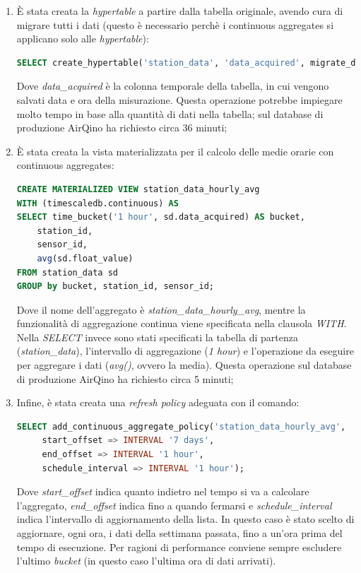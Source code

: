\begin{enumerate}
  \item È stata creata la \textit{hypertable} a partire dalla tabella originale, avendo cura di migrare tutti i dati (questo è necessario perchè i continuous aggregates si applicano solo alle \textit{hypertable}):
\vspace{1mm}
\begin{lstlisting}[language=sql]
SELECT create_hypertable('station_data', 'data_acquired', migrate_data => true);
\end{lstlisting}
Dove \textit{data\_acquired} è la colonna temporale della tabella, in cui vengono salvati data e ora della misurazione.
Questa operazione potrebbe impiegare molto tempo in base alla quantità di dati nella tabella; sul database di produzione AirQino ha richiesto circa 36 minuti;
  \item È stata creata la vista materializzata per il calcolo delle medie orarie con continuous aggregates:
\vspace{1mm}
\begin{lstlisting}[language=sql]
CREATE MATERIALIZED VIEW station_data_hourly_avg
WITH (timescaledb.continuous) AS
SELECT time_bucket('1 hour', sd.data_acquired) AS bucket, 
    station_id,  
    sensor_id, 
    avg(sd.float_value) 
FROM station_data sd
GROUP by bucket, station_id, sensor_id;
\end{lstlisting}
Dove il nome dell'aggregato è \textit{station\_data\_hourly\_avg}, mentre la funzionalità di aggregazione continua viene specificata nella clausola \textit{WITH}. Nella \textit{SELECT} invece sono stati specificati la tabella di partenza (\textit{station\_data}), l'intervallo di aggregazione (\textit{1 hour}) e l'operazione da eseguire per aggregare i dati (\textit{avg()}, ovvero la media).
Questa operazione sul database di produzione AirQino ha richiesto circa 5 minuti;
  \item Infine, è stata creata una \textit{refresh policy} adeguata con il comando:
\vspace{1mm}
\begin{lstlisting}[language=sql]
SELECT add_continuous_aggregate_policy('station_data_hourly_avg',
     start_offset => INTERVAL '7 days',
     end_offset => INTERVAL '1 hour',
     schedule_interval => INTERVAL '1 hour');
\end{lstlisting}
Dove \textit{start\_offset} indica quanto indietro nel tempo si va a calcolare l'aggregato, \textit{end\_offset} indica fino a quando fermarsi e \textit{schedule\_interval} indica l'intervallo di aggiornamento della lista.
In questo caso è stato scelto di aggiornare, ogni ora, i dati della settimana passata, fino a un'ora prima del tempo di esecuzione.
Per ragioni di performance conviene sempre escludere l'ultimo \textit{bucket} (in questo caso l'ultima ora di dati arrivati). \cite{timescale_ca}
\end{enumerate}

